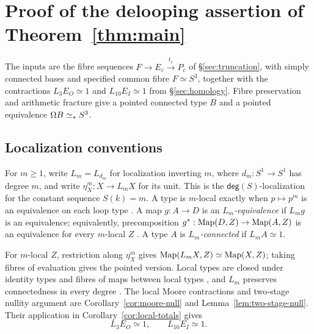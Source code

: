 \section{Proof of the delooping assertion of Theorem~\ref{thm:main}}\label{sec:construction}

The inputs are the fibre sequences $F\to E_c\xrightarrow{t_c}P_c$ of \S\ref{sec:truncation}, with simply connected bases and specified common fibre $F\simeq S^3$, together with the contractions $L_3E_O\simeq1$ and $L_{10}E_I\simeq1$ from \S\ref{sec:homology}. Fibre preservation and arithmetic fracture give a pointed connected type $B$ and a pointed equivalence $\Omega B\simeq_* S^3$.

\subsection{Localization conventions}\label{sec:local-tools}
For $m\geq1$, write $L_m=L_{d_m}$ for localization inverting $m$, where $d_m:S^1\to S^1$ has degree $m$, and write $\eta^m_X:X\to L_mX$ for its unit. This is the $\mathsf{deg}(S)$-localization for the constant sequence $S(k)=m$. A type is $m$-local exactly when $p\mapsto p^m$ is an equivalence on each loop type \cite[Lemma~4.2]{cors}. A map $g:A\to D$ is an \emph{$L_m$-equivalence} if $L_mg$ is an equivalence; equivalently, precomposition $g^*:\operatorname{Map}(D,Z)\to\operatorname{Map}(A,Z)$ is an equivalence for every $m$-local $Z$ \cite[Lemma~2.9]{cors}. A type $A$ is \emph{$L_m$-connected} if $L_mA\simeq1$.

For $m$-local $Z$, restriction along $\eta^m_X$ gives $\operatorname{Map}(L_mX,Z)\simeq\operatorname{Map}(X,Z)$; taking fibres of evaluation gives the pointed version. Local types are closed under identity types and fibres of maps between local types \cite[\S2.1]{cors}, and $L_m$ preserves connectedness in every degree \cite[Corollary~4.14]{cors}. The local Moore contractions and two-stage nullity argument are Corollary~\ref{cor:moore-null} and Lemma~\ref{lem:two-stage-null}. Their application in Corollary~\ref{cor:local-totals} gives
\begin{equation}\label{eq:local-totals}
L_3E_O\simeq1,\qquad L_{10}E_I\simeq1.
\end{equation}

